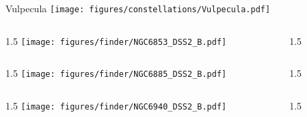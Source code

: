 \documentclass[final]{beamer}
\newlength{\colwidth}
\begin{document}

\begin{frame}[t]{\LARGE Vulpecula}
  \centering
  \texttt{[image: figures/constellations/Vulpecula.pdf]}
\end{frame}


\begin{frame}[t]{}
  \begin{columns}[T]
    \begin{column}{1.5\colwidth}
      \centering
      \texttt{[image: figures/finder/NGC6853\_DSS2\_B.pdf]}
    \end{column}
    \begin{column}{1.5\colwidth}
      \Large
      
    \end{column}
  \end{columns}
  \vspace{\fill}
  \begin{columns}[T]
    \begin{column}{1.5\colwidth}
      \centering
      \texttt{[image: figures/finder/NGC6885\_DSS2\_B.pdf]}
    \end{column}
    \begin{column}{1.5\colwidth}
      \Large
      
    \end{column}
  \end{columns}
\end{frame}

\begin{frame}[t]{}
  \begin{columns}[T]
    \begin{column}{1.5\colwidth}
      \centering
      \texttt{[image: figures/finder/NGC6940\_DSS2\_B.pdf]}
    \end{column}
    \begin{column}{1.5\colwidth}
      \Large
      
    \end{column}
  \end{columns}
  \vspace{\fill}
\end{frame}
\end{document}
